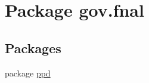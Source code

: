 \hypertarget{namespacegov_1_1fnal}{\section{Package gov.\-fnal}
\label{namespacegov_1_1fnal}
}
\subsection*{Packages}
\begin{DoxyCompactItemize}
\item 
package \hyperlink{namespacegov_1_1fnal_1_1ppd}{ppd}
\end{DoxyCompactItemize}
